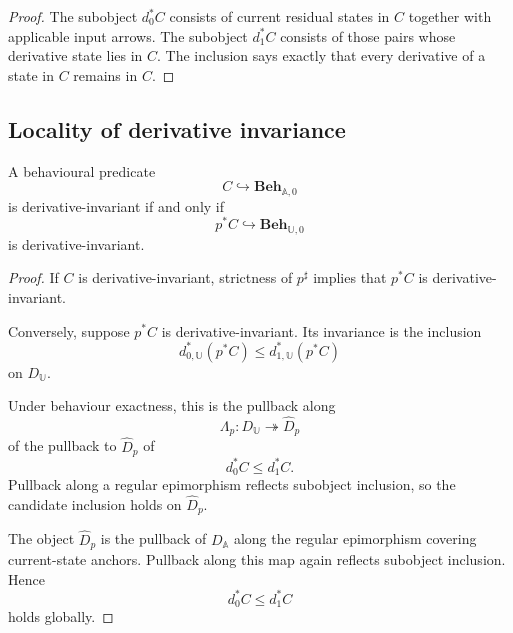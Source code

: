 \begin{proof}
The subobject \(d_0^\ast C\) consists of current residual states in \(C\)
together with applicable input arrows. The subobject \(d_1^\ast C\) consists
of those pairs whose derivative state lies in \(C\). The inclusion says
exactly that every derivative of a state in \(C\) remains in \(C\).
\end{proof}

\subsection{Locality of derivative invariance}
\label{subsec:locality-derivative-invariance-rigorous}

\begin{theorem}
\label{thm:derivative-invariance-interface-local}
A behavioural predicate
\[
    C\hookrightarrow\mathbf{Beh}_{\mathbb A,0}
\]
is derivative-invariant if and only if
\[
    p^\ast C
    \hookrightarrow
    \mathbf{Beh}_{\mathbb U,0}
\]
is derivative-invariant.
\end{theorem}

\begin{proof}
If \(C\) is derivative-invariant, strictness of \(p^\sharp\) implies that
\(p^\ast C\) is derivative-invariant.

Conversely, suppose \(p^\ast C\) is derivative-invariant. Its invariance is
the inclusion
\[
    d_{0,\mathbb U}^\ast(p^\ast C)
    \leq
    d_{1,\mathbb U}^\ast(p^\ast C)
\]
on \(D_{\mathbb U}\).

Under behaviour exactness, this is the pullback along
\[
    \Lambda_p:
    D_{\mathbb U}\twoheadrightarrow\widehat D_p
\]
of the pullback to \(\widehat D_p\) of
\[
    d_0^\ast C
    \leq
    d_1^\ast C.
\]
Pullback along a regular epimorphism reflects subobject inclusion, so the
candidate inclusion holds on \(\widehat D_p\).

The object \(\widehat D_p\) is the pullback of \(D_{\mathbb A}\) along the
regular epimorphism covering current-state anchors. Pullback along this map
again reflects subobject inclusion. Hence
\[
    d_0^\ast C
    \leq
    d_1^\ast C
\]
holds globally.
\end{proof}

